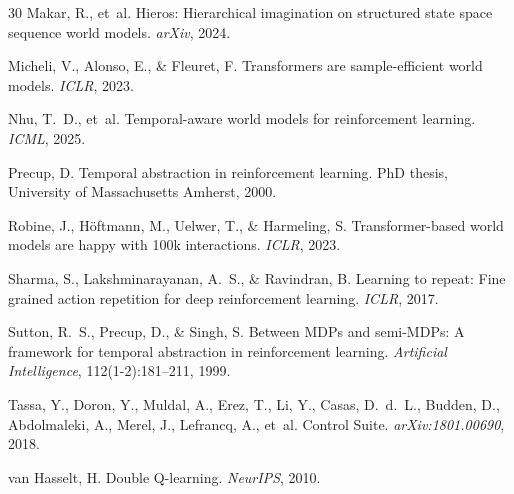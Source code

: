 \documentclass[10pt,letterpaper]{article}
\begin{document}
\begin{thebibliography}{30}
Makar, R., et~al.
\newblock Hieros: Hierarchical imagination on structured state space sequence world models.
\newblock \emph{arXiv}, 2024.

Micheli, V., Alonso, E., \& Fleuret, F.
\newblock Transformers are sample-efficient world models.
\newblock \emph{ICLR}, 2023.

Nhu, T.~D., et~al.
\newblock Temporal-aware world models for reinforcement learning.
\newblock \emph{ICML}, 2025.

Precup, D.
\newblock Temporal abstraction in reinforcement learning.
\newblock PhD thesis, University of Massachusetts Amherst, 2000.

Robine, J., H\"oftmann, M., Uelwer, T., \& Harmeling, S.
\newblock Transformer-based world models are happy with 100k interactions.
\newblock \emph{ICLR}, 2023.

Sharma, S., Lakshminarayanan, A.~S., \& Ravindran, B.
\newblock Learning to repeat: Fine grained action repetition for deep reinforcement learning.
\newblock \emph{ICLR}, 2017.

Sutton, R.~S., Precup, D., \& Singh, S.
\newblock Between {MDP}s and semi-{MDP}s: A framework for temporal abstraction in reinforcement learning.
\newblock \emph{Artificial Intelligence}, 112(1-2):181--211, 1999.

Tassa, Y., Doron, Y., Muldal, A., Erez, T., Li, Y., Casas, D.~d.~L., Budden, D., Abdolmaleki, A., Merel, J., Lefrancq, A., et~al.
 Control Suite.
\newblock \emph{arXiv:1801.00690}, 2018.

van Hasselt, H.
\newblock Double {Q}-learning.
\newblock \emph{NeurIPS}, 2010.

\end{thebibliography}
\end{document}
